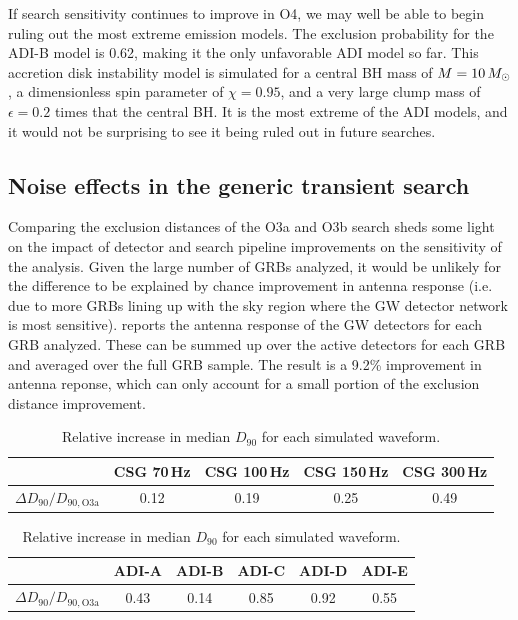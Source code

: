If search sensitivity continues to improve in \ac{O4}, we may well be able to begin ruling out the most extreme emission models.
The exclusion probability for the ADI-B model is 0.62, making it the only unfavorable ADI model so far.
This accretion disk instability model is simulated for a central \ac{BH} mass of $M=10\,M_{\odot}$, a dimensionless spin parameter of $\chi=0.95$, and a very large clump mass of $\epsilon=0.2$ times that the central \ac{BH}.
It is the most extreme of the ADI models, and it would not be surprising to see it being ruled out in future searches.


\subsection{Noise effects in the generic transient search}\label{sec:grb-o3b-noise}

Comparing the exclusion distances of the O3a and O3b search sheds some light on the impact of detector and search pipeline improvements on the sensitivity of the \xpip analysis.
Given the large number of GRBs analyzed, it would be unlikely for the difference to be explained by chance improvement in antenna response (i.e. due to more GRBs lining up with the sky region where the GW detector network is most sensitive).
\xpip reports the antenna response of the GW detectors for each GRB analyzed.
These can be summed up over the active detectors for each GRB and averaged over the full GRB sample.
The result is a 9.2\% improvement in antenna reponse, which can only account for a small portion of the exclusion distance improvement.

\begin{table}[h]
  \hspace{0.5cm}
  \caption
  {\label{tab:grb-o3b-compare-o3a} Relative increase in median $D_{90}$ for each \xpip simulated waveform.}
  \begin{tabular}{c c c c c}
    \hline
    \hline
    \rule{0pt}{4ex}
    & CSG 70\,Hz & CSG 100\,Hz & CSG 150\,Hz & CSG 300\,Hz \\
    \hline
    \rule[-2ex]{0pt}{4ex}
		$\Delta D_{90} / D_{90, \text{O3a}}$ & 0.12 & 0.19 & 0.25 & 0.49
  \end{tabular}
  \begin{tabular}{c c c c c c}
    \hline
    \hline
    \rule{0pt}{4ex}
    & ADI-A & ADI-B & ADI-C & ADI-D & ADI-E \\
    \hline
    \rule[-2ex]{0pt}{4ex}
    $\Delta D_{90} / D_{90, \text{O3a}}$ & 0.43 & 0.14 & 0.85 & 0.92 & 0.55 \\
    \hline
  \end{tabular}
\end{table}

